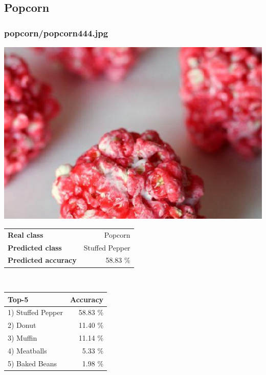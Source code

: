 \subsection{Popcorn}
    
\subsubsection{popcorn/popcorn444.jpg}

\begin{minipage}[t]{0.4\textwidth}
	\vspace{0pt}
	\includegraphics[width=\linewidth]{images/evaluation-images/popcorn/popcorn444.jpg}
\end{minipage}
\hfill
\begin{minipage}[t]{0.5\textwidth}
	\vspace{0pt}\raggedright
	\begin{tabularx}{\textwidth}{X r}
		\small \textbf{Real class} & \small Popcorn\\
		\small \textbf{Predicted class} & \small Stuffed Pepper\\
		\small \textbf{Predicted accuracy} & \small 58.83 \%
    \end{tabularx}\\
    
    \vspace{6pt}
	\begin{tabularx}{\textwidth}{X r}
        \small \textbf{Top-5} & \small \textbf{Accuracy} \\
        \hline
		\small 1) Stuffed Pepper & \small 58.83 \%\\\small 2) Donut & \small 11.40 \%\\\small 3) Muffin & \small 11.14 \%\\\small 4) Meatballs & \small 5.33 \%\\\small 5) Baked Beans & \small 1.98 \%
    \end{tabularx}
\end{minipage}
    
